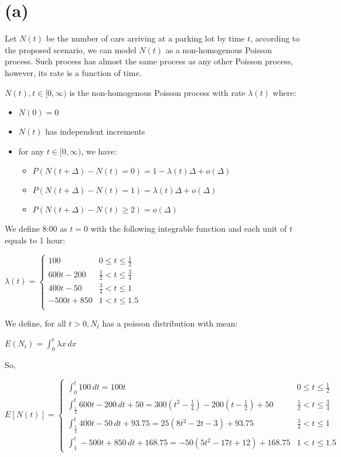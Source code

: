 \documentclass[]{article}
\providecommand{\tightlist}{%
  \setlength{\itemsep}{0pt}\setlength{\parskip}{0pt}}
\begin{document}
\hypertarget{a}{%
\section{(a)}\label{a}}

Let \textbf{\(N(t)\)} be the number of cars arriving at a parking lot by
time \textbf{\(t\)}, according to the proposed scenario, we can model
\textbf{\(N(t)\)} as a non-homogenous Poisson process. Such process has
almost the same process as any other Poisson process, however, its rate
is a function of time.

\(N(t), t \in [0, \infty)\) is the non-homogenous Poisson process with
rate \(\lambda (t)\) where:

\begin{itemize}
\tightlist
\item
  \(N(0) = 0\)
\item
  \(N(t)\) has independent increments
\item
  for any \(t \in [0, \infty)\), we have:

  \begin{itemize}
  \tightlist
  \item
    \(P(N(t + \Delta) - N(t) = 0) = 1 - \lambda (t) \Delta + o(\Delta)\)
  \item
    \(P(N(t + \Delta) - N(t) = 1) = \lambda (t) \Delta + o(\Delta)\)
  \item
    \(P(N(t + \Delta) - N(t) \geq 2) = o(\Delta)\)
  \end{itemize}
\end{itemize}

We define 8:00 as \(t=0\) with the following integrable function and
each unit of \(t\) equals to 1 hour:

\(\lambda (t) = \begin{cases} 100 & 0 \leq t \leq \frac{1}{2} \\ 600t - 200 & \frac{1}{2} < t \leq \frac{3}{4} \\ 400t - 50 & \frac{3}{4} < t \leq 1 \\ -500t + 850 & 1 < t \leq 1.5 \\ \end{cases}\)

We define, for all \(t > 0, N_t\) has a poisson distribution with mean:

\(E(N_t) = \int_{0}^t \lambda x\,dx\)

So,

\(E[N(t)] = \begin{cases} \int_{0}^t 100\,dt = 100t & 0 \leq t \leq \frac{1}{2} \\ \int_{\frac{1}{2}}^t 600t - 200 \,dt + 50 = 300(t^2 - \frac{1}{4}) - 200(t - \frac{1}{2}) + 50 & \frac{1}{2} < t \leq \frac{3}{4} \\ \int_{\frac{3}{4}}^t 400t - 50 \,dt + 93.75 = 25(8t^2 - 2t - 3) + 93.75 & \frac{3}{4} < t \leq 1 \\ \int_{1}^t -500t + 850\,dt + 168.75 = -50(5t^2 - 17t + 12) + 168.75 & 1 < t \leq 1.5 \end{cases}\)
\end{document}
